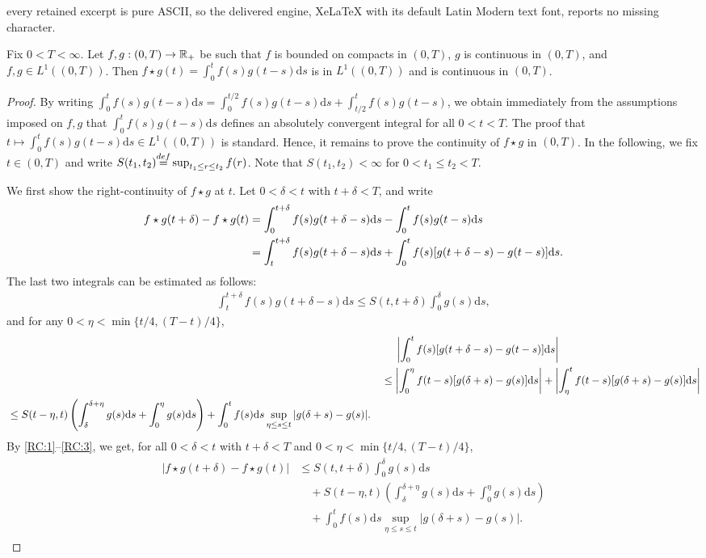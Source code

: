 \documentclass[10pt,a4paper]{amsart}
\newcommand{\R}{{\Bbb R}}
\renewcommand{\d}{{\mathrm d}}
\newcommand{\defeq}{{\stackrel{\rm def}{=}}}
\begin{document}
every retained excerpt is pure ASCII, so the delivered engine, XeLaTeX with its default Latin Modern text font, reports no missing character.
\begin{lem}\label{lem:LC1}
Fix $0<T<\infty$. Let $f,g:(0,T)\to \R_+$ be such that $f$ is bounded on compacts in $(0,T)$, $g$ is continuous in $(0,T)$, and $f,g\in L^1((0,T))$. Then $f\star g(t)=\int_0^t f(s)g(t-s)\d s$ is in $L^1((0,T))$ and is continuous in $(0,T)$.  
\end{lem}

\begin{proof}
By writing $\int_0^t f(s)g(t-s)\d s=\int_0^{t/2}f(s)g(t-s)\d s+\int_{t/2}^t f(s)g(t-s)$, we obtain immediately from the assumptions imposed on $f,g$ that $\int_0^t f(s)g(t-s)\d s$ defines an absolutely convergent integral for all $0<t<T$. The proof that $t\mapsto \int_0^t f(s)g(t-s)\d s\in L^1((0,T))$ is standard. 
Hence, it remains to prove the continuity of $f\star g$ in $(0,T)$. In the following,
we fix $t\in (0,T)$ and write $S(t_1,t_2)\defeq \sup_{t_1\leq r\leq t_2}f(r)$. Note that $S(t_1,t_2)<\infty$ for $0<t_1\leq t_2<T$.

We first show the right-continuity of $f\star g$ at $t$. Let $0<\delta<t$ with $t+\delta<T$, and write
\begin{align}
f\star g(t+\delta)-f\star g(t)&=\int_0^{t+\delta} f(s)g(t+\delta-s)\d s-\int_0^{t} f(s)g(t-s)\d s\notag\\
&=\int_t^{t+\delta} f(s)g(t+\delta-s)\d s+\int_0^t f(s)[g(t+\delta-s)-g(t-s)]\d s.\label{RC:1}
\end{align}
The last two integrals can be estimated as follows: 
\begin{align}
\int_t^{t+\delta}f(s)g(t+\delta-s)\d s\leq S(t,t+\delta)\int_0^\delta g(s)\d s,\label{RC:2}
\end{align}
and for any $0<\eta<\min\{t/4,(T-t)/4\}$, 
\begin{align}
&\quad\;\left|\int_0^t f(s)[g(t+\delta-s)-g(t-s)]\d s\right|\notag\\
&\leq \left|\int_0^\eta f(t-s)[g(\delta+s)-g(s)]\d s\right|+\left|
\int_\eta^t f(t-s)[g(\delta+s)-g(s)]\d s\right|\notag\\
\begin{split}
&\leq S(t-\eta,t)\left(\int_{\delta}^{\delta+\eta}g(s)\d s+\int_0^{\eta}g(s)\d s\right)+ \int_0^{t}f(s)\d s\sup_{\eta\leq s\leq t}|g(\delta+s)-g(s)|.\label{RC:3}
\end{split}
\end{align}
By \eqref{RC:1}--\eqref{RC:3}, we get, for all $0<\delta<t$ with $t+\delta<T$ and $0<\eta<\min\{t/4,(T-t)/4\}$,
\begin{align}
\begin{split}\label{RC:4}
|f\star g(t+\delta)-f\star g(t)|&\leq S(t,t+\delta)\int_0^{\delta} g(s)\d s\\
&\quad+S(t-\eta,t)
\left(\int_{\delta}^{\delta+\eta}g(s)\d s+\int_0^{\eta}g(s)\d s\right)\\
&\quad+\int_0^t f(s)\d s\sup_{\eta\leq s\leq t}|g(\delta+s)-g(s)|.
\end{split}
\end{align}



\end{proof}
\end{document}
